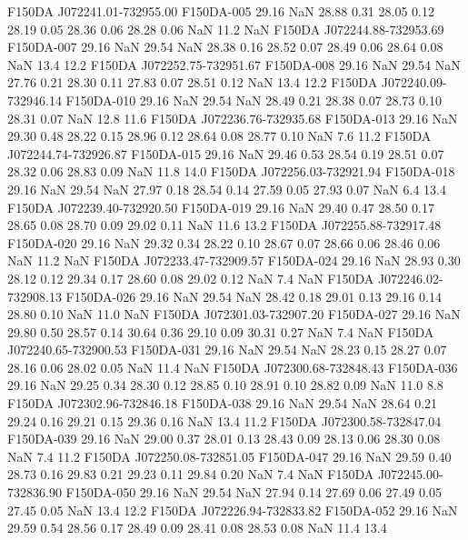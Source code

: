 F150DA J072241.01-732955.00   F150DA-005     29.16 NaN  28.88  0.31   28.05  0.12   28.19  0.05   28.36  0.06   28.28  0.06    NaN   11.2    NaN
F150DA J072244.88-732953.69   F150DA-007     29.16 NaN    29.54 NaN  28.38  0.16   28.52  0.07   28.49  0.06   28.64  0.08    NaN   13.4   12.2
F150DA J072252.75-732951.67   F150DA-008     29.16 NaN    29.54 NaN  27.76  0.21   28.30  0.11   27.83  0.07   28.51  0.12    NaN   13.4   12.2
F150DA J072240.09-732946.14   F150DA-010     29.16 NaN    29.54 NaN  28.49  0.21   28.38  0.07   28.73  0.10   28.31  0.07    NaN   12.8   11.6
F150DA J072236.76-732935.68   F150DA-013     29.16 NaN  29.30  0.48   28.22  0.15   28.96  0.12   28.64  0.08   28.77  0.10    NaN   7.6   11.2
F150DA J072244.74-732926.87   F150DA-015     29.16 NaN  29.46  0.53   28.54  0.19   28.51  0.07   28.32  0.06   28.83  0.09    NaN   11.8   14.0
F150DA J072256.03-732921.94   F150DA-018     29.16 NaN    29.54 NaN  27.97  0.18   28.54  0.14   27.59  0.05   27.93  0.07    NaN   6.4   13.4
F150DA J072239.40-732920.50   F150DA-019     29.16 NaN  29.40  0.47   28.50  0.17   28.65  0.08   28.70  0.09   29.02  0.11    NaN   11.6   13.2
F150DA J072255.88-732917.48   F150DA-020     29.16 NaN  29.32  0.34   28.22  0.10   28.67  0.07   28.66  0.06   28.46  0.06    NaN   11.2    NaN
F150DA J072233.47-732909.57   F150DA-024     29.16 NaN  28.93  0.30   28.12  0.12   29.34  0.17   28.60  0.08   29.02  0.12    NaN   7.4    NaN
F150DA J072246.02-732908.13   F150DA-026     29.16 NaN    29.54 NaN  28.42  0.18   29.01  0.13   29.16  0.14   28.80  0.10    NaN   11.0    NaN
F150DA J072301.03-732907.20   F150DA-027     29.16 NaN  29.80  0.50   28.57  0.14   30.64  0.36   29.10  0.09   30.31  0.27    NaN   7.4    NaN
F150DA J072240.65-732900.53   F150DA-031     29.16 NaN    29.54 NaN  28.23  0.15   28.27  0.07   28.16  0.06   28.02  0.05    NaN   11.4    NaN
F150DA J072300.68-732848.43   F150DA-036     29.16 NaN  29.25  0.34   28.30  0.12   28.85  0.10   28.91  0.10   28.82  0.09    NaN   11.0   8.8
F150DA J072302.96-732846.18   F150DA-038     29.16 NaN    29.54 NaN  28.64  0.21   29.24  0.16   29.21  0.15   29.36  0.16    NaN   13.4   11.2
F150DA J072300.58-732847.04   F150DA-039     29.16 NaN  29.00  0.37   28.01  0.13   28.43  0.09   28.13  0.06   28.30  0.08    NaN   7.4   11.2
F150DA J072250.08-732851.05   F150DA-047     29.16 NaN  29.59  0.40   28.73  0.16   29.83  0.21   29.23  0.11   29.84  0.20    NaN   7.4    NaN
F150DA J072245.00-732836.90   F150DA-050     29.16 NaN    29.54 NaN  27.94  0.14   27.69  0.06   27.49  0.05   27.45  0.05    NaN   13.4   12.2
F150DA J072226.94-732833.82   F150DA-052     29.16 NaN  29.59  0.54   28.56  0.17   28.49  0.09   28.41  0.08   28.53  0.08    NaN   11.4   13.4
